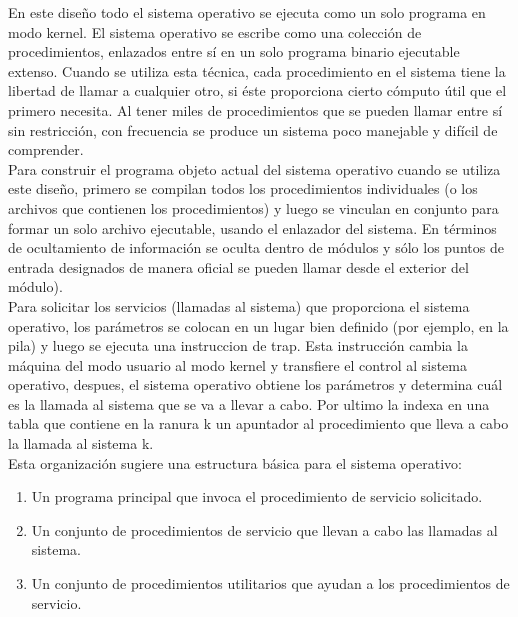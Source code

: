 \documentclass[10pt,a4paper,spanish]{report}
\begin{document}
  \noindent
  En este diseño todo el sistema operativo se ejecuta como un solo programa en modo kernel. El sistema operativo se escribe como una colección de procedimientos, enlazados entre sí en un solo programa binario ejecutable extenso. Cuando se utiliza esta técnica, cada procedimiento en el sistema tiene la libertad de llamar a cualquier otro, si éste proporciona cierto cómputo útil que el primero necesita. Al tener miles de procedimientos que se pueden llamar entre sí sin restricción, con frecuencia se produce un sistema poco manejable y difícil de comprender. \\

  \noindent
  Para construir el programa objeto actual del sistema operativo cuando se utiliza este diseño, primero se compilan todos los procedimientos individuales (o los archivos que contienen los procedimientos) y luego se vinculan en conjunto para formar un solo archivo ejecutable, usando el enlazador del sistema. En términos de ocultamiento de información se oculta dentro de módulos y sólo los puntos de entrada designados de manera oficial se pueden llamar desde el exterior del módulo). \\

  \noindent
  Para solicitar los servicios (llamadas al sistema) que proporciona el sistema operativo, los parámetros se colocan en un lugar bien definido (por ejemplo, en la pila) y luego se ejecuta una instruccion de trap. Esta instrucción cambia la máquina del modo usuario al modo kernel y transfiere el control al sistema operativo, despues, el sistema operativo obtiene los parámetros y determina cuál es la llamada al sistema que se va a llevar a cabo. Por ultimo la indexa en una tabla que contiene en la ranura k un apuntador al procedimiento que lleva a cabo la llamada al sistema k. \\

  \noindent
  Esta organización sugiere una estructura básica para el sistema operativo:

  \begin{enumerate}
    \item Un programa principal que invoca el procedimiento de servicio solicitado.
    \item Un conjunto de procedimientos de servicio que llevan a cabo las llamadas al sistema.
    \item Un conjunto de procedimientos utilitarios que ayudan a los procedimientos de servicio.
  \end{enumerate}
\end{document}
